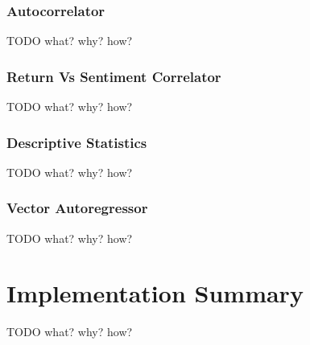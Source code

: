 \subsubsection{Autocorrelator}
TODO what? why? how?
\subsubsection{Return Vs Sentiment Correlator}
TODO what? why? how?
\subsubsection{Descriptive Statistics}
TODO what? why? how?
\subsubsection{Vector Autoregressor}
TODO what? why? how?
\section{Implementation Summary}
TODO what? why? how?